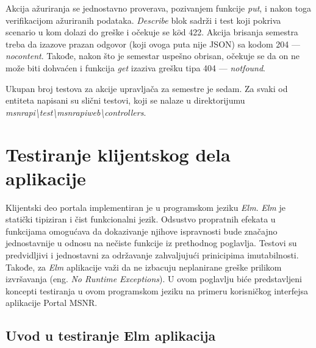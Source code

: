 \documentclass[12pt,oneside]{memoir}
\begin{document}
\par Akcija ažuriranja se jednostavno proverava, pozivanjem funkcije \emph{put}, i nakon toga verifikacijom ažuriranih podataka. \emph{Describe} blok sadrži i test koji pokriva scenario u kom dolazi do greške i očekuje se  k$\hat{o}$d 422. Akcija brisanja semestra treba da izazove prazan odgovor (koji ovoga puta nije JSON) sa kodom 204 --- \emph{no{\textunderscore}content}. Takođe, nakon što je semestar uspešno obrisan, očekuje se da on ne može biti dohvaćen i funkcija \emph{get} izaziva grešku tipa 404 --- \emph{not{\textunderscore}found}.
\par Ukupan broj testova za akcije upravljača za semestre je sedam. Za svaki od entiteta napisani su slični testovi, koji se nalaze u direktorijumu \emph{msnr{\textunderscore}api{\textbackslash}test{\textbackslash}msnr{\textunderscore}api{\textunderscore}web{\textbackslash}controllers}. 




\chapter{Testiranje klijentskog dela aplikacije}
\label{chp:elm}
\par Klijentski deo portala implementiran je u programskom jeziku \emph{Elm}. \emph{Elm} je statički tipiziran i čist funkcionalni jezik. Odsustvo propratnih efekata u funkcijama omogućava da dokazivanje njihove ispravnosti bude značajno jednostavnije u odnosu na nečiste funkcije iz prethodnog poglavlja. Testovi su predvidljivi i jednostavni za održavanje zahvaljujući prinicipima imutabilnosti. Takođe, za \emph{Elm} aplikacije važi da ne izbacuju neplanirane greške prilikom izvršavanja (eng. \emph{No Runtime Exceptions}). U ovom poglavlju biće predstavljeni koncepti testiranja u ovom programskom jeziku na primeru korisničkog interfejsa aplikacije Portal MSNR. 

\section{Uvod u testiranje Elm aplikacija}
\label{sec:uvod-elm}
\end{document}
